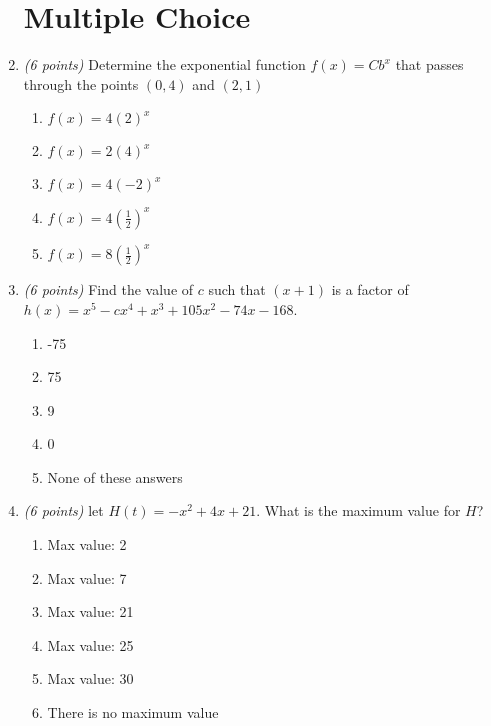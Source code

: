 \documentclass[fleqn]{article}
\renewcommand{\thispagestyle}[1]{}
\begin{document}
\begin{enumerate}
\vspace{1.25in}

\pagebreak
\thispagestyle{fancy}{
\lhead{}
}

\section*{Multiple Choice}

\item \textit{(6 points)} Determine the exponential function $f(x) = Cb^x$ that passes through the points $(0,4)$ and $(2,1)$
\begin{enumerate}
\item $f(x) = 4(2)^x$
\item $f(x) = 2(4)^x$
\item $f(x) = 4(-2)^x$
\item $f(x) = 4(\frac{1}{2})^x$
\item $f(x) = 8(\frac{1}{2})^x$
\end{enumerate}

\vspace{0.5in}

\item \textit{(6 points)} Find the value of $c$ such that $(x + 1)$ is a factor of $h(x) = x^5-c x^4+x^3+105 x^2-74 x-168$.
\begin{multicols}{3}
\begin{enumerate}
\item -75
\item 75
\item 9
\item 0
\item None of these answers
\end{enumerate}
\end{multicols}

\vspace{0.5in}

\item \textit{(6 points)} let $H(t) = -x^2+4x+21$.  What is the maximum value for $H$?
\begin{multicols}{3}
\begin{enumerate}
\item Max value: 2
\item Max value: 7
\item Max value: 21
\item Max value: 25
\item Max value: 30
\item There is no maximum value
\end{enumerate}
\end{multicols}


\end{enumerate}
\end{document}
